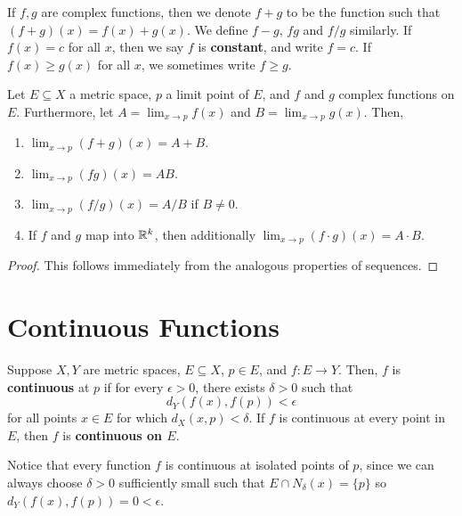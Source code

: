\begin{definition} %
    If $f, g$ are complex functions, then we denote $f + g$ to be the function such that $(f + g)(x) = f(x) + g(x)$. We define $f - g$, $fg$ and $f / g$ similarly. If $f(x) = c$ for all $x$, then we say $f$ is \textbf{constant}, and write $f = c$. If $f(x) \ge g(x)$ for all $x$, we sometimes write $f \ge g$.
\end{definition}

\begin{theorem} %
    Let $E \subseteq X$ a metric space, $p$ a limit point of $E$, and $f$ and $g$ complex functions on $E$. Furthermore, let $A = \lim_{x \to p} f(x)$ and $B = \lim_{x \to p} g(x)$. Then,
\begin{enumerate}
    \item $\lim_{x \to p} (f + g)(x) = A + B$.
    \item $\lim_{x \to p} (fg)(x) = AB$.
    \item $\lim_{x \to p} (f/g)(x) = A/B$ if $B \ne 0$.
    \item If $f$ and $g$ map into $\mathbb{R}^k$, then additionally $\lim_{x \to p} (f \cdot g)(x) = A \cdot B$.
\end{enumerate}

\begin{proof}
    This follows immediately from the analogous properties of sequences.
\end{proof}
\end{theorem}

\section{Continuous Functions}

\begin{definition} %
    Suppose $X, Y$ are metric spaces, $E \subseteq X$, $p \in E$, and $f: E \to Y$. Then, $f$ is \textbf{continuous} at $p$ if for every $\epsilon > 0$, there exists $\delta > 0$ such that
    \[
        d_Y(f(x), f(p)) < \epsilon
    \]
    for all points $x \in E$ for which $d_X(x, p) < \delta$. If $f$ is continuous at every point in $E$, then $f$ is \textbf{continuous on $E$}.

    Notice that every function $f$ is continuous at isolated points of $p$, since we can always choose $\delta > 0$ sufficiently small such that $E \cap N_\delta(x) = \{p\}$ so $d_Y(f(x), f(p)) = 0 < \epsilon$.
\end{definition}

